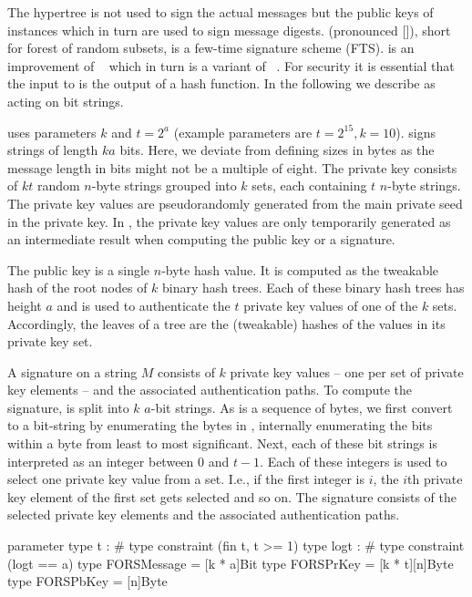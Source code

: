 The \spx hypertree \hyper is not used to sign the actual messages but the
public keys of \fors instances which in turn are used to sign message digests.
\fors (pronounced []), short for forest of random subsets, is a few-time
signature scheme (FTS). \fors is an improvement of \horst~\cite{Bernstein2015}
which in turn is a variant of \hors~\cite{Reyzin2002}.
For security it is essential that the input to \fors is the output of a
hash function. In the following we describe \fors as acting on bit strings.


\fors uses parameters $k$ and $t=2^a$ (example parameters are $t=2^{15}, k=10$).
\fors signs strings of length $ka$ bits. Here, we deviate from defining
sizes in bytes as the message length in bits might not be a multiple of eight.
The private key consists of $kt$
random $n$-byte strings grouped
into $k$ sets, each containing $t$ $n$-byte strings. The private key values
are pseudorandomly generated from the main private seed \sseed in the \spx private
key. In \spx, the \fors private key values are only temporarily generated as an
intermediate result when computing the public key or a signature.

The \fors public key is a single $n$-byte hash value. It is computed as the
tweakable hash of the root nodes of $k$ binary hash trees. Each of these binary
hash trees has height $a$ and is used to authenticate the $t$ private key
values of one of the $k$ sets. Accordingly, the leaves of a tree are the
(tweakable) hashes of the values in its private key set.

A signature on a string $M$ consists of $k$ private key values -- one per
set of private key elements -- and the
associated authentication paths. To compute the signature, \md is
split into $k$ $a$-bit strings. As \md is a sequence of bytes,
we first convert to a bit-string by enumerating the bytes in \md,
internally enumerating the bits within a byte from least to most significant.
Next, each of these bit strings is
interpreted as an integer between $0$ and $t-1$. Each of these integers is used to
select one private key value from a set. I.e., if the first integer is $i$, the
$i$th private key element of the first set gets selected and so on. The signature
consists of the selected private key elements and the associated authentication
paths.

\begin{code}
  parameter
    type t : #
    type constraint (fin t, t >= 1)
    type logt : #
    type constraint (logt == a)
    type FORSMessage = [k * a]Bit
    type FORSPrKey = [k * t][n]Byte
    type FORSPbKey = [n]Byte
\end{code}

